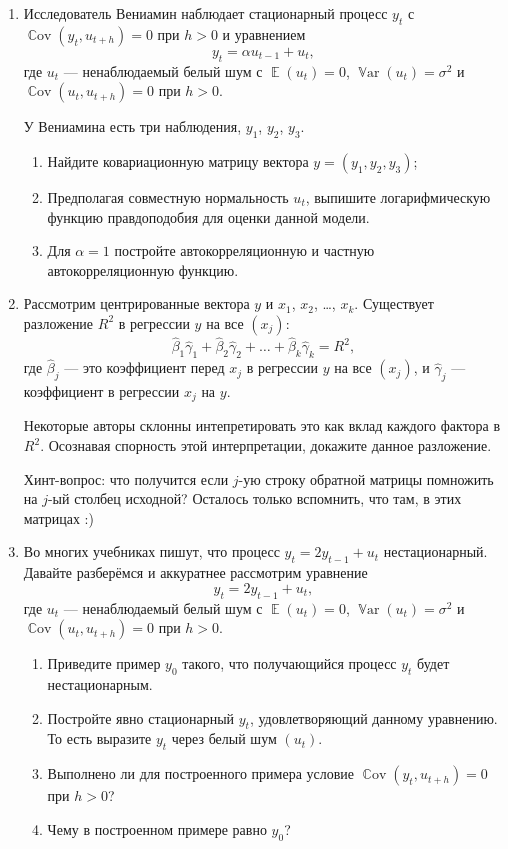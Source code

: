 \documentclass[12pt, a4paper]{article}
\DeclareMathOperator{\E}{\mathbb{E}}
\DeclareMathOperator{\Var}{\mathbb{V}ar}
\DeclareMathOperator{\Cov}{\mathbb{C}ov}
\def \hb{\hat{\beta}}
\begin{document}
\begin{enumerate}

\item Исследователь Вениамин наблюдает стационарный процесс $y_t$ с $\Cov(y_t, u_{t+h})=0$ при $h>0$ и уравнением
\[
y_t = \alpha u_{t-1} + u_t,
\]
где $u_t$ — ненаблюдаемый белый шум с $\E(u_t)=0$, $\Var(u_t)=\sigma^2$ и $\Cov(u_t, u_{t+h})=0$ при $h>0$.

У Вениамина есть три наблюдения, $y_1$, $y_2$, $y_3$.

\begin{enumerate}
  \item Найдите ковариационную матрицу вектора $y=(y_1, y_2, y_3)$;
  \item Предполагая совместную нормальность $u_t$, выпишите логарифмическую функцию правдоподобия для оценки данной модели.
  \item Для $\alpha=1$ постройте автокорреляционную и частную автокорреляционную функцию.
\end{enumerate}

\item Рассмотрим центрированные вектора $y$ и $x_1$, $x_2$, \ldots, $x_k$. Существует разложение $R^2$ в регрессии $y$ на все $(x_j)$:
\[
\hb_{1} \hat\gamma_1 + \hb_2\hat\gamma_2 + \ldots + \hb_k \hat\gamma_k = R^2,
\]
где $\hb_j$ — это коэффициент перед $x_j$ в регрессии $y$ на все $(x_j)$, и $\hat\gamma_j$ — коэффициент в регрессии $x_j$ на $y$.

Некоторые авторы склонны интепретировать это как вклад каждого фактора в $R^2$. Осознавая спорность этой интерпретации, докажите данное разложение.

Хинт-вопрос: что получится если $j$-ую строку обратной матрицы помножить на $j$-ый столбец исходной? Осталось только вспомнить, что там, в этих матрицах :)

\item Во многих учебниках пишут, что процесс $y_t = 2y_{t-1}+u_t$ нестационарный. Давайте разберёмся и аккуратнее рассмотрим уравнение
\[
y_t = 2y_{t-1} + u_t,
\]
где $u_t$ — ненаблюдаемый белый шум с $\E(u_t)=0$, $\Var(u_t)=\sigma^2$ и $\Cov(u_t, u_{t+h})=0$ при $h>0$.

\begin{enumerate}
  \item Приведите пример $y_0$ такого, что получающийся процесс $y_t$ будет нестационарным.
  \item Постройте явно стационарный $y_t$, удовлетворяющий данному уравнению. То есть выразите $y_t$ через белый шум $(u_t)$.
  \item Выполнено ли для построенного примера условие $\Cov(y_t, u_{t+h})=0$ при $h>0$?
  \item Чему в построенном примере равно $y_0$?
\end{enumerate}



\end{enumerate}
\end{document}
